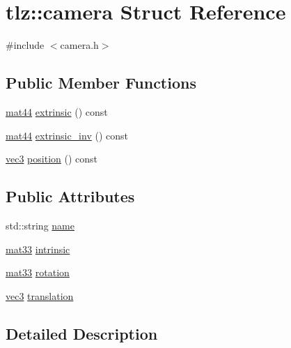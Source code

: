 \hypertarget{structtlz_1_1camera}{}\section{tlz\+:\+:camera Struct Reference}
\label{structtlz_1_1camera}


{\ttfamily \#include $<$camera.\+h$>$}

\subsection*{Public Member Functions}
\begin{DoxyCompactItemize}
\item 
\hyperlink{namespacetlz_a56693a40f2ef608241dddb9064281089}{mat44} \hyperlink{structtlz_1_1camera_aace4b782f50c06158735709101fbdc86}{extrinsic} () const 
\item 
\hyperlink{namespacetlz_a56693a40f2ef608241dddb9064281089}{mat44} \hyperlink{structtlz_1_1camera_af623cd98390f6588c45ad59bbbe13355}{extrinsic\+\_\+inv} () const 
\item 
\hyperlink{namespacetlz_ad0646d752ddb9d40d702d40cc6dc54a1}{vec3} \hyperlink{structtlz_1_1camera_afe02b3b0900a2e0a6fc92408908050b7}{position} () const 
\end{DoxyCompactItemize}
\subsection*{Public Attributes}
\begin{DoxyCompactItemize}
\item 
std\+::string \hyperlink{structtlz_1_1camera_a0c5fcf5d5293da538fc73fa9a8351763}{name}
\item 
\hyperlink{namespacetlz_a6679497d5121f319147594e1f344ef57}{mat33} \hyperlink{structtlz_1_1camera_a55d65ad4264874a12d4383f9fca88f05}{intrinsic}
\item 
\hyperlink{namespacetlz_a6679497d5121f319147594e1f344ef57}{mat33} \hyperlink{structtlz_1_1camera_a537b8f4583f8fbefbb0e648c769495b3}{rotation}
\item 
\hyperlink{namespacetlz_ad0646d752ddb9d40d702d40cc6dc54a1}{vec3} \hyperlink{structtlz_1_1camera_aac48f184af54f06d867b60e30e3a710c}{translation}
\end{DoxyCompactItemize}


\subsection{Detailed Description}


